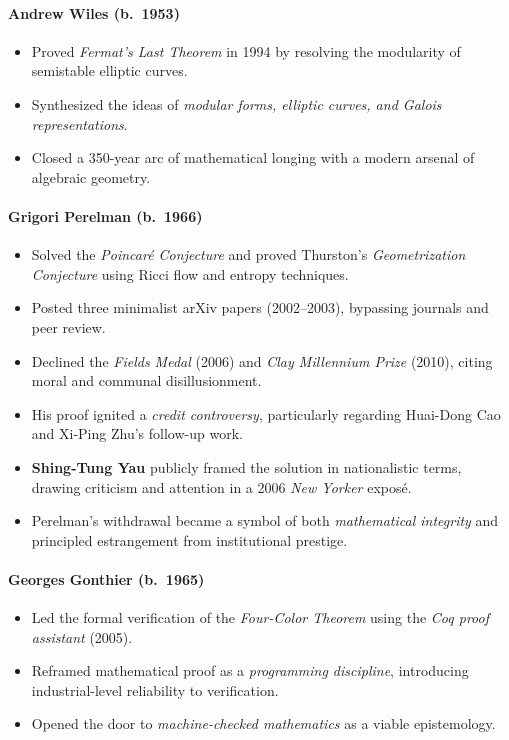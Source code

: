 \documentclass[9pt]{article}
\begin{document}
\paragraph{Andrew Wiles (b.\ 1953)}
\begin{itemize}
  \item Proved \textit{Fermat’s Last Theorem} in 1994 by resolving the modularity of semistable elliptic curves.
  \item Synthesized the ideas of \textit{modular forms, elliptic curves, and Galois representations}.
  \item Closed a 350-year arc of mathematical longing with a modern arsenal of algebraic geometry.
\end{itemize}

\paragraph{Grigori Perelman (b.\ 1966)}
\begin{itemize}
  \item Solved the \textit{Poincaré Conjecture} and proved Thurston’s \textit{Geometrization Conjecture} using Ricci flow and entropy techniques.
  \item Posted three minimalist arXiv papers (2002--2003), bypassing journals and peer review.
  \item Declined the \textit{Fields Medal} (2006) and \textit{Clay Millennium Prize} (2010), citing moral and communal disillusionment.
  \item His proof ignited a \textit{credit controversy}, particularly regarding Huai-Dong Cao and Xi-Ping Zhu’s follow-up work.
  \item \textbf{Shing-Tung Yau} publicly framed the solution in nationalistic terms, drawing criticism and attention in a 2006 \textit{New Yorker} exposé.
  \item Perelman's withdrawal became a symbol of both \textit{mathematical integrity} and principled estrangement from institutional prestige.
\end{itemize}

\paragraph{Georges Gonthier (b.\ 1965)}
\begin{itemize}
  \item Led the formal verification of the \textit{Four-Color Theorem} using the \textit{Coq proof assistant} (2005).
  \item Reframed mathematical proof as a \textit{programming discipline}, introducing industrial-level reliability to verification.
  \item Opened the door to \textit{machine-checked mathematics} as a viable epistemology.
\end{itemize}
\end{document}
